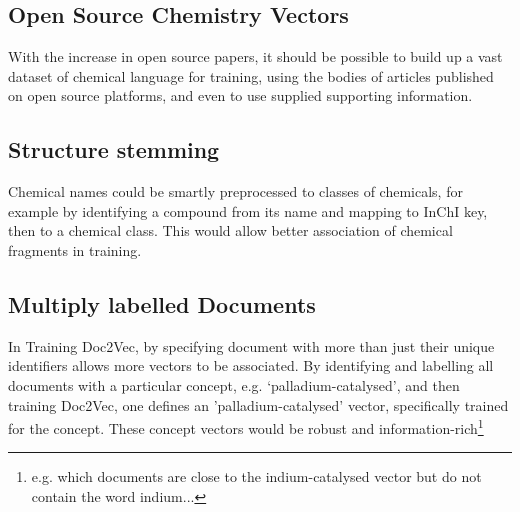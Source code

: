 \subsection{Open Source Chemistry Vectors}
With the increase in open source papers, it should be possible to build up a vast dataset of chemical language for training, using the bodies of articles published on open source platforms, and even to use supplied supporting information. 
\subsection{Structure stemming}
Chemical names could be smartly preprocessed to classes of chemicals, for example by identifying a compound from its name and mapping to InChI key, then to a chemical class. This would allow better association of chemical fragments in training.
\subsection{Multiply labelled Documents}
In Training Doc2Vec, by specifying document with more than just their unique identifiers allows more vectors to be associated. By identifying and labelling all documents with a particular concept, e.g. `palladium-catalysed', and then training Doc2Vec, one defines an 'palladium-catalysed' vector, specifically trained for the concept. These concept vectors would be robust and information-rich\footnote{e.g. which documents are close to the indium-catalysed vector but do not contain the word indium...}
